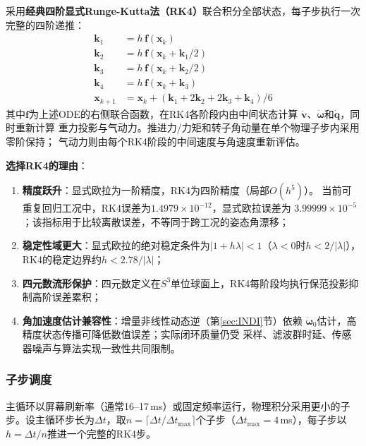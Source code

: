 采用\textbf{经典四阶显式Runge-Kutta法（RK4）}联合积分全部状态，每子步执行一次完整的四阶递推：
\begin{equation}
    \begin{aligned}
        \mathbf{k}_1 &= h\,\mathbf{f}(\mathbf{x}_k) \\
        \mathbf{k}_2 &= h\,\mathbf{f}(\mathbf{x}_k + \mathbf{k}_1/2) \\
        \mathbf{k}_3 &= h\,\mathbf{f}(\mathbf{x}_k + \mathbf{k}_2/2) \\
        \mathbf{k}_4 &= h\,\mathbf{f}(\mathbf{x}_k + \mathbf{k}_3) \\
        \mathbf{x}_{k+1} &= \mathbf{x}_k + (\mathbf{k}_1 + 2\mathbf{k}_2 + 2\mathbf{k}_3 + \mathbf{k}_4)/6
    \end{aligned}
    \label{eq:rk4}
\end{equation}
其中$\mathbf{f}$为上述ODE的右侧联合函数，在RK4各阶段内由中间状态计算
$\dot{\mathbf{v}}$、$\dot{\boldsymbol{\omega}}$和$\dot{\mathbf{q}}$，同时重新计算
重力投影与气动力。推进力/力矩和转子角动量在单个物理子步内采用零阶保持；
气动力则由每个RK4阶段的中间速度与角速度重新评估。

\textbf{选择RK4的理由}：
\begin{enumerate}[label=(\arabic*)]
    \item \textbf{精度跃升}：显式欧拉为一阶精度，RK4为四阶精度（局部$O(h^5)$）。
          当前可重复回归工况中，RK4误差为$1.4979\times10^{-12}$，显式欧拉误差为
          $3.99999\times10^{-5}$；该指标用于比较离散误差，不等同于跨工况的姿态角漂移；
    \item \textbf{稳定性域更大}：显式欧拉的绝对稳定条件为$|1+h\lambda|<1$（$\lambda<0$时$h<2/|\lambda|$），RK4的稳定边界约$h<2.78/|\lambda|$；
    \item \textbf{四元数流形保护}：四元数定义在$S^3$单位球面上，RK4每阶段均执行保范投影抑制高阶误差累积；
    \item \textbf{角加速度估计兼容性}：增量非线性动态逆（第\ref{sec:INDI}节）依赖
          $\dot{\boldsymbol{\omega}}_0$估计，高精度状态传播可降低数值误差；实际闭环质量仍受
          采样、滤波群时延、传感器噪声与算法实现一致性共同限制。
\end{enumerate}

\subsubsection{子步调度}

主循环以屏幕刷新率（通常16--17\,ms）或固定频率运行，物理积分采用更小的子步。设主循环步长为$\Delta t$，取$n = \lceil \Delta t / \Delta t_{\max} \rceil$个子步（$\Delta t_{\max}=4$\,ms），每子步以$h = \Delta t / n$推进一个完整的RK4步。

